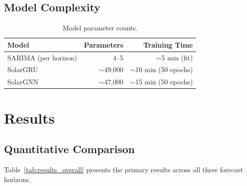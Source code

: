 \documentclass[11pt,a4paper]{article}
\begin{document}
\subsection{Model Complexity}

\begin{table}[H]
\centering
\caption{Model parameter counts.}
\label{tab:params}
\begin{tabular}{lrr}
\toprule
\textbf{Model} & \textbf{Parameters} & \textbf{Training Time} \\
\midrule
SARIMA (per horizon) & 4--5 & $\sim$5 min (fit) \\
SolarGRU & $\sim$49,000 & $\sim$10 min (50 epochs) \\
SolarGNN & $\sim$47,000 & $\sim$15 min (50 epochs) \\
\bottomrule
\end{tabular}
\end{table}

\section{Results}
\label{sec:results}

\subsection{Quantitative Comparison}

Table~\ref{tab:results_overall} presents the primary results across all three forecast horizons.
\end{document}
